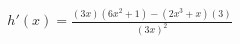 \documentclass[preview]{standalone}
\begin{document}
\begin{align*}
h'(x) = \frac{(3x)(6x^2+1)-(2x^3+x)(3)}{(3x)^2}
\end{align*}
\end{document}

